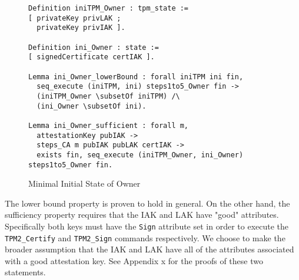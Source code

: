 \begin{figure}[h]
\begin{lstlisting}[language=Coq]
Definition iniTPM_Owner : tpm_state :=
[ privateKey privLAK ;
  privateKey privIAK ].

Definition ini_Owner : state :=
[ signedCertificate certIAK ].

Lemma ini_Owner_lowerBound : forall iniTPM ini fin,
  seq_execute (iniTPM, ini) steps1to5_Owner fin ->
  (iniTPM_Owner \subsetOf iniTPM) /\
  (ini_Owner \subsetOf ini).

Lemma ini_Owner_sufficient : forall m,
  attestationKey pubIAK ->
  steps_CA m pubIAK pubLAK certIAK ->
  exists fin, seq_execute (iniTPM_Owner, ini_Owner) steps1to5_Owner fin.
\end{lstlisting}
\caption{Minimal Initial State of Owner}
\end{figure}
The lower bound property is proven to hold in general. On the other hand, the sufficiency property requires that the IAK and LAK have "good" attributes. Specifically both keys must have the \verb|Sign| attribute set in order to execute the \verb|TPM2_Certify| and \verb|TPM2_Sign| commands respectively. We choose to make the broader assumption that the IAK and LAK have all of the attributes associated with a good attestation key. See Appendix x for the proofs of these two statements.






